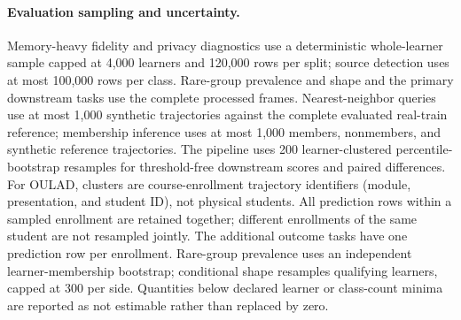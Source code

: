 \documentclass[10pt]{article}
\begin{document}
\paragraph{Evaluation sampling and uncertainty.}
Memory-heavy fidelity and privacy diagnostics use a deterministic whole-learner
sample capped at 4,000 learners and 120,000 rows per split; source detection
uses at most 100,000 rows per class. Rare-group prevalence and shape and the
primary downstream tasks use the complete processed frames. Nearest-neighbor
queries use at most 1,000 synthetic trajectories against the complete evaluated
real-train reference; membership inference uses at most 1,000 members,
nonmembers, and synthetic reference trajectories. The pipeline uses 200
learner-clustered percentile-bootstrap resamples for threshold-free downstream
scores and paired differences. For OULAD, clusters are course-enrollment
trajectory identifiers (module, presentation, and student ID), not physical
students. All prediction rows within a sampled enrollment are retained together;
different enrollments of the same student are not resampled jointly. The
additional outcome tasks have one prediction row per enrollment. Rare-group prevalence uses an independent
learner-membership bootstrap; conditional shape resamples qualifying learners,
capped at 300 per side. Quantities below declared learner or class-count minima
are reported as not estimable rather than replaced by zero.
\end{document}
